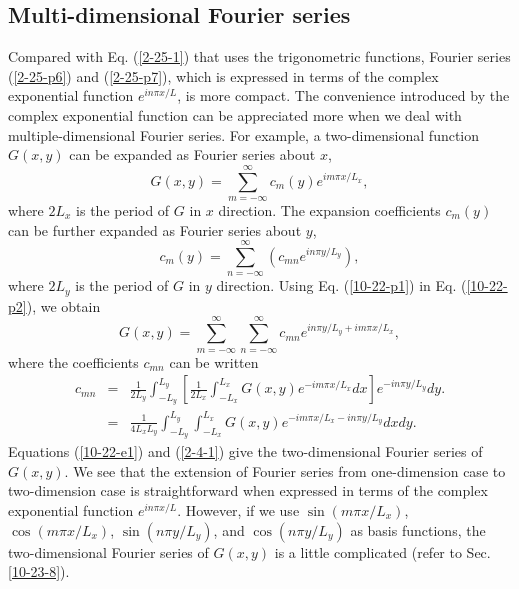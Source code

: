 \documentclass{article}
\begin{document}
\subsection{Multi-dimensional Fourier series}

Compared with Eq. (\ref{2-25-1}) that uses the trigonometric functions,
Fourier series (\ref{2-25-p6}) and (\ref{2-25-p7}), which is expressed in
terms of the complex exponential function $e^{i n \pi x / L}$, is more
compact. The convenience introduced by the complex exponential function can be
appreciated more when we deal with multiple-dimensional Fourier series. For
example, a two-dimensional function $G (x, y)$ can be expanded as Fourier
series about $x$,
\begin{equation}
  \label{10-22-p2} G (x, y) = \sum_{m = - \infty}^{\infty} c_m (y) e^{i m \pi
  x / L_x},
\end{equation}
where $2 L_x$ is the period of $G$ in $x$ direction. The expansion
coefficients $c_m (y)$ can be further expanded as Fourier series about $y$,
\begin{equation}
  \label{10-22-p1} c_m (y) = \sum_{n = - \infty}^{\infty} (c_{m n} e^{i n \pi
  y / L_y}),
\end{equation}
where $2 L_y$ is the period of $G$ in $y$ direction. Using Eq.
(\ref{10-22-p1}) in Eq. (\ref{10-22-p2}), we obtain
\begin{equation}
  \label{10-22-e1} G (x, y) = \sum_{m = - \infty}^{\infty} \sum_{n = -
  \infty}^{\infty} c_{m n} e^{i n \pi y / L_y + i m \pi x / L_x},
\end{equation}
where the coefficients $c_{m n}$ can be written
\begin{eqnarray}
  c_{m n} & = & \frac{1}{2 L_y} \int_{- L_y}^{L_y} \left[ \frac{1}{2 L_x}
  \int_{- L_x}^{L_x} G (x, y) e^{- i m \pi x / L_x} d x \right] e^{- i n \pi y
  / L_y} d y. \nonumber\\
  & = & \frac{1}{4 L_x L_y} \int_{- L_y}^{L_y} \int_{- L_x}^{L_x} G (x, y)
  e^{- i m \pi x / L_x - i n \pi y / L_y} d x d y.  \label{2-4-1}
\end{eqnarray}
Equations (\ref{10-22-e1}) and (\ref{2-4-1}) give the two-dimensional Fourier
series of $G (x, y)$. We see that the extension of Fourier series from
one-dimension case to two-dimension case is straightforward when expressed in
terms of the complex exponential function $e^{i n \pi x / L}$. However, if we
use $\sin (m \pi x / L_x)$, $\cos (m \pi x / L_x)$, $\sin (n \pi y / L_y)$,
and $\cos (n \pi y / L_y)$ as basis functions, the two-dimensional Fourier
series of $G (x, y)$ is a little complicated (refer to Sec. \ref{10-23-8}).
\end{document}
